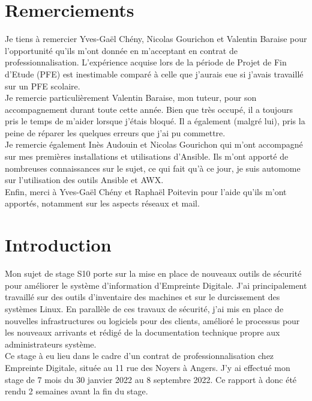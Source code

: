 \documentclass[12pt]{article}
\begin{document}
\newpage
\section*{Remerciements}
Je tiens à remercier Yves-Gaël Chény, Nicolas Gourichon et Valentin Baraise pour l'opportunité qu'ils m'ont donnée en m'acceptant en contrat de professionnalisation. 
L'expérience acquise lors de la période de Projet de Fin d'Etude (\gls{PFE}) est inestimable comparé à celle que j'aurais eue si j'avais travaillé sur un \gls{PFE} scolaire. \\

Je remercie particulièrement Valentin Baraise, mon tuteur, pour son accompagnement durant toute cette année. 
Bien que très occupé, il a toujours pris le temps de m'aider lorsque j'étais bloqué. 
Il a également (malgré lui), pris la peine de réparer les quelques erreurs que j'ai pu commettre. \\

Je remercie également Inès Audouin et Nicolas Gourichon qui m'ont accompagné sur mes premières installations et utilisations d'\gls{Ansible}. 
Ils m'ont apporté de nombreuses connaissances sur le sujet, ce qui fait qu'à ce jour, je suis automome sur l'utilisation des outils \gls{Ansible} et AWX. \\

Enfin, merci à Yves-Gaël Chény et Raphaël Poitevin pour l'aide qu'ils m'ont apportés, notamment sur les aspects réseaux et mail.


\newpage
\tableofcontents

\newpage
\section*{Introduction}
Mon sujet de stage S10 porte sur la mise en place de nouveaux outils de sécurité pour améliorer le système d'information d'Empreinte Digitale. 
J'ai principalement travaillé sur des outils d'inventaire des machines et sur le durcissement des systèmes \gls{Linux}. 
En parallèle de ces travaux de sécurité, j'ai mis en place de nouvelles infrastructures ou logiciels pour des clients, amélioré le processus pour les nouveaux arrivants et rédigé de la documentation technique propre aux administrateurs système. \\

Ce stage à eu lieu dans le cadre d'un contrat de professionnalisation chez Empreinte Digitale, située au 11 rue des Noyers à Angers. 
J'y ai effectué mon stage de 7 mois du 30 janvier 2022 au 8 septembre 2022. 
Ce rapport à donc été rendu 2 semaines avant la fin du stage. \\
\end{document}
